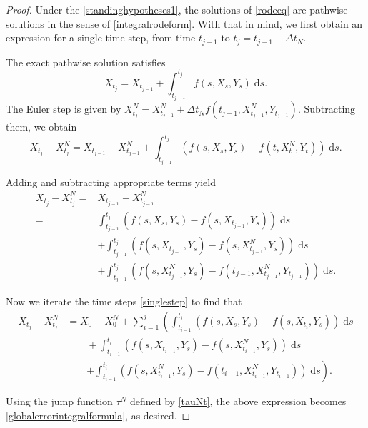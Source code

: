 \documentclass[reqno,12pt]{amsart}
\theoremstyle{plain} %
\theoremstyle{definition} %
\begin{document}
\begin{proof}
    Under the \cref{standinghypotheses1}, the solutions of \eqref{rodeeq} are pathwise solutions in the sense of \eqref{integralrodeform}. With that in mind, we first obtain an expression for a single time step, from time $t_{j-1}$ to $t_j = t_{j-1} + \Delta t_N$.
    
    The exact pathwise solution satisfies
    $$
    X_{t_j} = X_{t_{j-1}} + \int_{t_{j-1}}^{t_j} f(s, X_s, Y_s) \;\mathrm{d}s.
    $$
    The Euler step is given by $X_{t_j}^N = X_{t_{j-1}}^N + \Delta t_N f(t_{j-1}, X_{t_{j-1}}^N, Y_{t_{j-1}}).$ Subtracting them, we obtain
    $$
    X_{t_j} - X_{t_j}^N = X_{t_{j-1}} - X_{t_{j-1}}^N + \int_{t_{j-1}}^{t_j} \left( f(s, X_s, Y_s) - f(t, X_t^N, Y_t) \right)\;\mathrm{d}s.
    $$

    Adding and subtracting appropriate terms yield
    \begin{equation}
        \label{singlestep}
        \begin{aligned}
            X_{t_j} - X_{t_j}^N  = & X_{t_{j-1}} - X_{t_{j-1}}^N \\
            = &  \int_{t_{j-1}}^{t_j} \left( f(s, X_s, Y_s) - f(s, X_{t_{j-1}}, Y_s) \right)\;\mathrm{d}s \\ 
            & + \int_{t_{j-1}}^{t_j} \left( f(s, X_{t_{j-1}}, Y_s) - f(s, X_{t_{j-1}}^N, Y_s) \right)\;\mathrm{d}s \\
            & + \int_{t_{j-1}}^{t_j} \left( f(s, X_{t_{j-1}}^N, Y_s) - f(t_{j-1}, X_{t_{j-1}}^N, Y_{t_{j-1}}) \right)\;\mathrm{d}s.
        \end{aligned}
    \end{equation}

    Now we iterate the time steps \eqref{singlestep} to find that
    \begin{align*}
        X_{t_j} - X_{t_j}^N & = X_0 - X_0^N + \sum_{i=1}^{j} \left(\int_{t_{i-1}}^{t_i} \left( f(s, X_s, Y_s) - f(s, X_{t_{i}}, Y_s) \right)\;\mathrm{d}s \right. \\ 
        & \qquad + \int_{t_{i-1}}^{t_i} \left( f(s, X_{t_{i-1}}, Y_s) - f(s, X_{t_{i-1}}^N, Y_s) \right)\;\mathrm{d}s \\
        & \qquad \left. + \int_{t_{i-1}}^{t_i} \left( f(s, X_{t_{i-1}}^N, Y_s) - f(t_{i-1}, X_{t_{i-1}}^N, Y_{t_{i-1}}) \right)\;\mathrm{d}s \right).
    \end{align*}

    Using the jump function $\tau^N$ defined by \eqref{tauNt}, the above expression becomes \eqref{globalerrorintegralformula}, as desired.
\end{proof}
\end{document}
